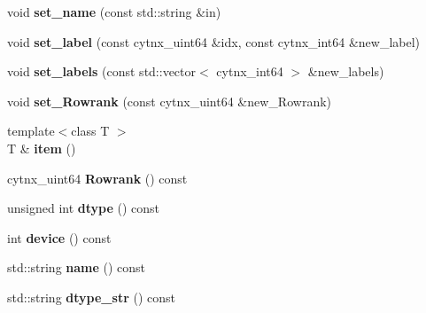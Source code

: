 \begin{DoxyCompactItemize}
\mbox{\label{classcytnx_1_1UniTensor_ad2ee7e756d5fc9e05faf814b99151544}} 
void {\bfseries set\+\_\+name} (const std\+::string \&in)
\item 
\mbox{\label{classcytnx_1_1UniTensor_a960547851b0811c2417eec7bdd99641d}} 
void {\bfseries set\+\_\+label} (const cytnx\+\_\+uint64 \&idx, const cytnx\+\_\+int64 \&new\+\_\+label)
\item 
\mbox{\label{classcytnx_1_1UniTensor_a6e17d3849392171f61d6bebd5ac2b3f2}} 
void {\bfseries set\+\_\+labels} (const std\+::vector$<$ cytnx\+\_\+int64 $>$ \&new\+\_\+labels)
\item 
\mbox{\label{classcytnx_1_1UniTensor_ae0682945588dd82a4d97a97db49c1b51}} 
void {\bfseries set\+\_\+\+Rowrank} (const cytnx\+\_\+uint64 \&new\+\_\+\+Rowrank)
\item 
\mbox{\label{classcytnx_1_1UniTensor_a8872f2780d7b3dd00608229599a848d2}} 
{\footnotesize template$<$class T $>$ }\\T \& {\bfseries item} ()
\item 
\mbox{\label{classcytnx_1_1UniTensor_aa1463f073b58cb79d46a0974d9f6ef89}} 
cytnx\+\_\+uint64 {\bfseries Rowrank} () const
\item 
\mbox{\label{classcytnx_1_1UniTensor_aa3a370844d981cb86c3d784ecbb573c1}} 
unsigned int {\bfseries dtype} () const
\item 
\mbox{\label{classcytnx_1_1UniTensor_a8e4a44ff5b17788458dc8cf2642f811f}} 
int {\bfseries device} () const
\item 
\mbox{\label{classcytnx_1_1UniTensor_a55941f8078598076309486cc1de3d73f}} 
std\+::string {\bfseries name} () const
\item 
\mbox{\label{classcytnx_1_1UniTensor_a91173048a7985caa45786a7c08f68c40}} 
std\+::string {\bfseries dtype\+\_\+str} () const
\item 
\mbox{\label{classcytnx_1_1UniTensor_ae7862c67c8ce93035aa7c6ffb3fc0f17}} 

\end{DoxyCompactItemize}

